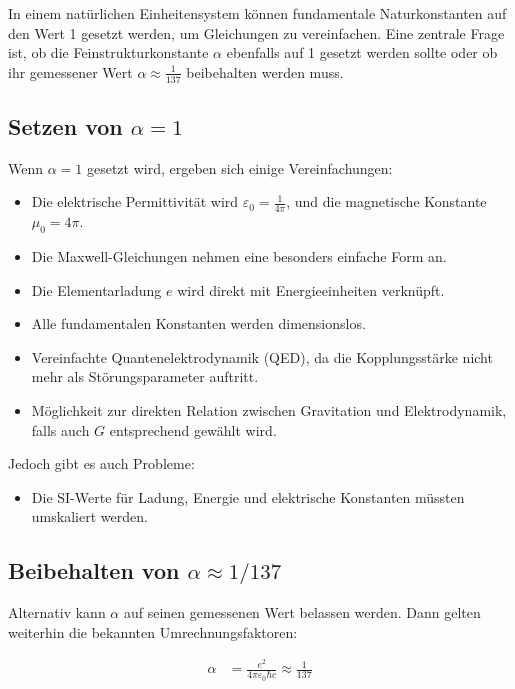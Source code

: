 \documentclass{article}
\begin{document}
	In einem natürlichen Einheitensystem können fundamentale Naturkonstanten auf den Wert 1 gesetzt werden, um Gleichungen zu vereinfachen. Eine zentrale Frage ist, ob die Feinstrukturkonstante \( \alpha \) ebenfalls auf 1 gesetzt werden sollte oder ob ihr gemessener Wert \( \alpha \approx \frac{1}{137} \) beibehalten werden muss.
	
	\subsection*{Setzen von \( \alpha = 1 \)}
	
	Wenn \( \alpha = 1 \) gesetzt wird, ergeben sich einige Vereinfachungen:
	
	\begin{itemize}
		\item Die elektrische Permittivität wird \( \varepsilon_0 = \frac{1}{4\pi} \), und die magnetische Konstante \( \mu_0 = 4\pi \).
		\item Die Maxwell-Gleichungen nehmen eine besonders einfache Form an.
		\item Die Elementarladung \( e \) wird direkt mit Energieeinheiten verknüpft.
		\item Alle fundamentalen Konstanten werden dimensionslos.
		\item Vereinfachte Quantenelektrodynamik (QED), da die Kopplungsstärke nicht mehr als Störungsparameter auftritt.
		\item Möglichkeit zur direkten Relation zwischen Gravitation und Elektrodynamik, falls auch \( G \) entsprechend gewählt wird.
	\end{itemize}
	
	Jedoch gibt es auch Probleme:
	
	\begin{itemize}
		\item Die SI-Werte für Ladung, Energie und elektrische Konstanten müssten umskaliert werden.
	\end{itemize}
	
	\subsection*{Beibehalten von \( \alpha \approx 1/137 \)}
	
	Alternativ kann \( \alpha \) auf seinen gemessenen Wert belassen werden. Dann gelten weiterhin die bekannten Umrechnungsfaktoren:
	
	\begin{align*}
		\alpha &= \frac{e^2}{4\pi \varepsilon_0 \hbar c} \approx \frac{1}{137}
	\end{align*}
	
\end{document}
